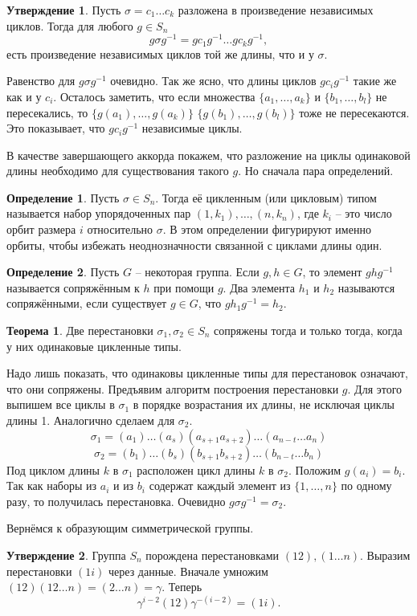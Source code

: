 \documentclass[10pt,a4paper,oneside]{book}
\theoremstyle{definition}
\newtheorem*{defn}{\color{yellow!30!red} Определение}
\newtheorem{thm}{\color{red!40!black}Теорема}
\newtheorem{utvr}{\color{blue!50!black}Утверждение}
\def\thrm{\begin{thm}}
\def\ethrm{\end{thm}}
\def\dfn{\begin{defn}}
\def\edfn{\end{defn}}
\def\utv{\begin{utvr}}
\def\eutv{\end{utvr}}
\begin{document}
\utv Пусть $\sigma=c_1\dots c_k$ разложена в произведение независимых циклов. Тогда для любого $g\in S_n$
$$g\sigma g^{-1}= gc_1 g^{-1}\dots gc_kg^{-1},$$
есть произведение независимых циклов той же длины, что и у $\sigma$.
\eutv
\proof Равенство для $g\sigma g^{-1}$ очевидно. Так же ясно, что длины циклов $gc_i g^{-1}$ такие же как и у $c_i$. Осталось заметить, что если множества $\{a_1,\dots,a_k\}$ и $\{b_1,\dots,b_l\}$ не пересекались, то $\{g(a_1),\dots,g(a_k)\}$ $\{g(b_1),\dots,g(b_l)\}$ тоже не пересекаются. Это показывает, что $gc_i g^{-1}$ независимые циклы.
\endproof

В качестве завершающего аккорда покажем, что разложение на циклы одинаковой длины необходимо для существования такого $g$. Но сначала пара определений.
\dfn Пусть $\sigma \in S_n$. Тогда её цикленным (или цикловым) типом называется набор упорядоченных пар $(1,k_1),\dots, (n,k_n)$, где $k_i$ -- это число орбит размера $i$ относительно $\sigma$. В этом определении фигурируют именно орбиты, чтобы избежать неоднозначности связанной с циклами длины один.
\edfn

\dfn Пусть $G$ -- некоторая группа. Если $g,h\in G$, то элемент $ghg^{-1}$ называется сопряжённым к $h$ при помощи $g$. Два элемента $h_1$ и $h_2$ называются сопряжёнными, если существует $g \in G$, что $gh_1g^{-1}=h_2$.
\edfn 

\thrm Две перестановки $\sigma_1,\sigma_2\in S_n$ сопряжены тогда и только тогда, когда у них одинаковые цикленные типы.
\ethrm
\proof Надо лишь показать, что одинаковы цикленные типы для перестановок означают, что они сопряжены. Предъявим алгоритм построения перестановки $g$. Для этого выпишем все циклы в $\sigma_1$ в порядке возрастания их длины, не исключая циклы длины 1. Аналогично сделаем для $\sigma_2$. 
$$\sigma_1=(a_1)\dots(a_s)(a_{s+1}a_{s+2})\dots (a_{n-t}\dots a_n)$$
$$\sigma_2=(b_1)\dots(b_s)(b_{s+1}b_{s+2})\dots (b_{n-t}\dots b_n)$$
Под циклом длины $k$ в $\sigma_1$ расположен цикл длины $k$ в $\sigma_2$. Положим $g(a_i)=b_i$. Так как наборы из $a_i$ и из $b_i$ содержат каждый элемент из $\{1,\dots,n\}$ по одному разу, то получилась перестановка. Очевидно $g\sigma g^{-1}=\sigma_2$.
\endproof

Вернёмся к образующим симметрической группы.

\utv Группа $S_n$ порождена перестановками $(12), (1 \dots n)$. 
\proof Выразим перестановки $(1i)$ через данные. Вначале умножим $(12)(12\dots n)=(2\dots n)=\gamma$. Теперь
$$\gamma^{i-2}(12)\gamma^{-(i-2)}=(1i).$$
\endproof
\eutv
\end{document}
